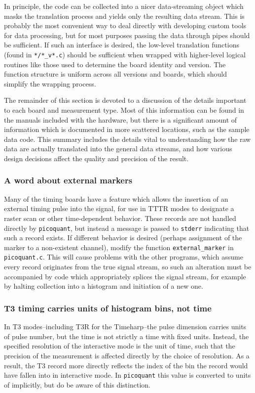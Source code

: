 \documentclass{article}
\newcommand{\stderr}{\texttt{stderr}}
\newcommand{\picoquant}{\texttt{picoquant}}
\begin{document}
In principle, the code can be collected into a nicer data-streaming object which masks the translation process and yields only the resulting data stream. This is probably the most convenient way to deal directly with developing custom tools for data processing, but for most purposes passing the data through pipes should be sufficient. If such an interface is desired, the low-level translation functions (found in \texttt{*/*\_v*.c}) should be sufficient when wrapped with higher-level logical routines like those used to determine the board identity and version. The function structure is uniform across all versions and boards, which should simplify the wrapping process.

The remainder of this section is devoted to a discussion of the details important to each board and measurement type. Most of this information can be found in the manuals included with the hardware, but there is a significant amount of information which is documented in more scattered locations, such as the sample data code. This summary includes the details vital to understanding how the raw data are actually translated into the general data streams, and how various design decisions affect the quality and precision of the result.

\subsubsection{A word about external markers}
Many of the timing boards have a feature which allows the insertion of an external timing pulse into the signal, for use in TTTR modes to designate a raster scan or other time-dependent behavior. These records are not handled directly by \picoquant, but instead a message is passed to \stderr{} indicating that such a record exists. If different behavior is desired (perhaps assignment of the marker to a non-existent channel), modify the function \texttt{external\_marker} in \texttt{picoquant.c}. This will cause problems with the other programs, which assume every record originates from the true signal stream, so such an alteration must be accompanied by code which appropriately splices the signal stream, for example by halting collection into a histogram and initiation of a new one.

\subsubsection{T3 timing carries units of histogram bins, not time}
In T3 modes--including T3R for the Timeharp--the pulse dimension carries units of pulse number, but the time is not strictly a time with fixed units. Instead, the specified resolution of the interactive mode is the unit of time, such that the precision of the measurement is affected directly by the choice of resolution. As a result, the T3 record more directly reflects the index of the bin the record would have fallen into in interactive mode. In \picoquant{} this value is converted to units of \pico\second{} implicitly, but do be aware of this distinction.
\end{document}
